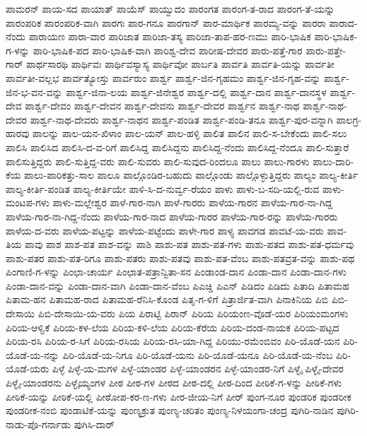 ಪಾಮರನ್
ಪಾಯ-ಸದ
ಪಾಯಾತ್
ಪಾಯೆಸ್
ಪಾಯ್ವುದಂ
ಪಾರಂಗತ
ಪಾರಂಗ-ತ-ರಾದ
ಪಾರಂಗ-ತೆ-ಯನ್ನು
ಪಾರಂಪರಿಕ
ಪಾರಂಪರಿಕ-ವಾಗಿ
ಪಾರಗಃ
ಪಾರ-ಗನೂ
ಪಾರಗಾನ್
ಪಾರ-ಮಾರ್ಥಿಕ
ಪಾರಮ್ಯ-ವನ್ನು
ಪಾರರಾ
ಪಾರಾದ-ನೆಂದು
ಪಾರಾಯಣ
ಪಾರಾ-ವಾರ
ಪಾರಿಜಾತ
ಪಾರಿಜಾ-ತಸ್ಯ
ಪಾರಿಜಾ-ತಾಪ-ಹರ-ಣಮು
ಪಾರಿ-ಭಾಷಿಕ
ಪಾರಿ-ಭಾಷಿಕ-ಗ-ಳನ್ನು
ಪಾರಿ-ಭಾಷಿಕ-ಪದ
ಪಾರಿ-ಭಾಷಿಕ-ವಾಗಿ
ಪಾರಿಶ್ವ-ದೇವ
ಪಾರೀಷ-ದೇವರ
ಪಾರು-ಪತ್ತೆ-ಗಾರ
ಪಾರು-ಪತ್ತೇ-ಗಾರ್
ಪಾರ್ಥಸಾರಥಿ
ಪಾರ್ಥಿವಃ
ಪಾರ್ಥಿವಸ್ಯಾಸ್ಯ
ಪಾರ್ಥಿವೋ
ಪಾರ್ಬತಿ
ಪಾರ್ವತಿ
ಪಾರ್ವತಿ-ಯನ್ನು
ಪಾರ್ವತೀ
ಪಾರ್ವತೀ-ವಲ್ಲಭ
ಪಾರ್ವತ್ಯೋಸ್ತು
ಪಾರ್ವರುಂ
ಪಾರ್ಶ್ವ
ಪಾರ್ಶ್ವ-ಜಿನ-ಗೃಹಮಂ
ಪಾರ್ಶ್ವ-ಜಿನ-ಗೃಹ-ವನ್ನು
ಪಾರ್ಶ್ವ-ಜಿನ-ಭ-ವನ-ವನ್ನು
ಪಾರ್ಶ್ವ-ಜಿನಾ-ಲಯ
ಪಾರ್ಶ್ವ-ಜಿನೇಶ್ವರ
ಪಾರ್ಶ್ವ-ದಲ್ಲಿ
ಪಾರ್ಶ್ವ-ದಾನ
ಪಾರ್ಶ್ವ-ದಾನಸ್ಥಳ
ಪಾರ್ಶ್ವ-ದೇವ
ಪಾರ್ಶ್ವ-ದೇವಂ
ಪಾರ್ಶ್ವ-ದೇವನ
ಪಾರ್ಶ್ವ-ದೇವನು
ಪಾರ್ಶ್ವ-ದೇವರ
ಪಾರ್ಶ್ವನ
ಪಾರ್ಶ್ವ-ನಾಥ
ಪಾರ್ಶ್ವ-ನಾಥ-ದೇವರ
ಪಾರ್ಶ್ವ-ನಾಥ-ದೇವರು
ಪಾರ್ಶ್ವ-ನಾಥನ
ಪಾರ್ಶ್ವ-ಪಂಡಿತ
ಪಾರ್ಶ್ವ-ಪಂಡಿ-ತನೂ
ಪಾರ್ಶ್ವ-ಪುರ-ವನ್ನಾಗಿ
ಪಾಲಗ್ರ-ಹಾರವು
ಪಾಲನ್ನು
ಪಾಲ-ಯನ-ಖಿಳಾಂ
ಪಾಲ-ಯನ್
ಪಾಲ-ಹಳ್ಳಿ
ಪಾಲಿತ
ಪಾಲಿನ
ಪಾಲಿ-ಸ-ಬೇಕೆಂದು
ಪಾಲಿ-ಸಲು
ಪಾಲಿಸಿ
ಪಾಲಿಸಿದ
ಪಾಲಿಸಿ-ದ-ವ-ರಿಗೆ
ಪಾಲಿಸಿದ್ದ
ಪಾಲಿಸಿದ್ದನು
ಪಾಲಿಸಿದ್ದ-ನೆಂದು
ಪಾಲಿಸಿದ್ದ-ನೆಂದೂ
ಪಾಲಿ-ಸುತ್ತಾರೆ
ಪಾಲಿಸುತ್ತಿದ್ದರು
ಪಾಲಿ-ಸುತ್ತಿದ್ದ-ವರು
ಪಾಲಿ-ಸುವರು
ಪಾಲಿ-ಸುವುದ-ರಿಂದಲೂ
ಪಾಲು
ಪಾಲು-ಗಾರಳು
ಪಾಲು-ದಾರಿ-ಕೆಯ
ಪಾಲು-ಪಾರಿಕತ್ತು-ಸಾಲ
ಪಾಲೂ
ಪಾಲ್ಗೊಂಡಿರ-ಬಹುದು
ಪಾಲ್ಗೊಂಡು
ಪಾಲ್ಗೊಳ್ಳುತ್ತಿದ್ದರು
ಪಾಲ್ಯಂ
ಪಾಲ್ಯ-ಕೀರ್ತಿ
ಪಾಲ್ಯ-ಕೀರ್ತಿ-ಪಂಡಿತ
ಪಾಲ್ಯ-ಕೀರ್ತಿಯೇ
ಪಾಳಿ-ಸಿ-ದ-ನುರ್ವ್ವ-ರೆಯಂ
ಪಾಳು
ಪಾಳು-ಬ-ಸದಿ-ಯಲ್ಲಿ-ರುವ
ಪಾಳು-ಮಂಟಪ-ಗಳು
ಪಾಳು-ಮಲ್ಲೇಶ್ವರ
ಪಾಳೆ-ಗಾರ-ನಾಗಿ
ಪಾಳೆ-ಗಾರರು
ಪಾಳೆಯ-ಗಾರನ
ಪಾಳೆಯ-ಗಾರ-ನಾ-ಗಿದ್ದ
ಪಾಳೆಯ-ಗಾರ-ನಾ-ಗಿದ್ದ-ನೆಂದು
ಪಾಳೆಯ-ಗಾರ-ನಾದ
ಪಾಳೆಯ-ಗಾರರ
ಪಾಳೆಯ-ಗಾರ-ರನ್ನು
ಪಾಳೆಯ-ಗಾರರು
ಪಾಳೆಯ-ದ-ವರು
ಪಾಳೆಯ-ಪಟ್ಟನ್ನು
ಪಾಳೆಯ-ಪಟ್ಟೆಂದು
ಪಾಳೇ-ಗಾರ
ಪಾಳ್ಯ
ಪಾವಗಡ
ಪಾವಟೆ-ಯ-ವರು
ಪಾವ-ತಿಯ
ಪಾವು
ಪಾಶ
ಪಾಶ-ಪತ
ಪಾಶ-ವನ್ನು
ಪಾಶಿ
ಪಾಶು-ಪತ
ಪಾಶು-ಪತ-ಗಳು
ಪಾಶು-ಪತದ
ಪಾಶು-ಪತ-ಧರ್ಮವು
ಪಾಶು-ಪತರ
ಪಾಶು-ಪತ-ರಿಗೂ
ಪಾಶು-ಪತರು
ಪಾಶು-ಪತವು
ಪಾಶು-ಪತ-ವೆಂಬ
ಪಾಶು-ಪತವ್ರತ-ವನ್ನು
ಪಾಶು-ಪಥ
ಪಿಂಗಾಣಿ-ಗ-ಳನ್ನು
ಪಿಂಛಾ-ಚಾರ್ಯ
ಪಿಂಛಾತ-ಪತ್ರಾನ್ವಿತಾ-ಸನ
ಪಿಂಡಾಂಡ-ದಾನ
ಪಿಂಡಾ-ದಾನ
ಪಿಂಡಾ-ದಾನ-ಗಳು
ಪಿಂಡಾ-ದಾನ-ವನ್ನು
ಪಿಂಡಾ-ದಾನ-ವಾಗಿ
ಪಿಂಡಾ-ದಾನ-ವೆಂಬ
ಪಿಎಚ್ಡಿ
ಪಿಎನ್
ಪಿಡಿದಂ
ಪಿಡಿದು
ಪಿತಾದಿ
ಪಿತಾಮಹ
ಪಿತಾಮ-ಹನ
ಪಿತಾಮಹ-ರಾದ
ಪಿತಾಮಹ-ರೆನಿಸಿ-ಕೊಂಡ
ಪಿತೃ-ಗ-ಳಿಗೆ
ಪಿತ್ರಾರ್ಜಿತ-ವಾಗಿ
ಪಿನಾಕಿನಿಯ
ಪಿಬಿ
ಪಿಬಿ-ದೇಸಾಯಿ
ಪಿಬಿ-ದೇಸಾಯಿ-ಯ-ವರು
ಪಿಯ
ಪಿರಾಟ್ಟಿ
ಪಿರಾನ್
ಪಿರಿಯ
ಪಿರಿಯಂಣ-ವೊಡೆ-ಯರ
ಪಿರಿಯಂಮಂಗಳು
ಪಿರಿಯ-ಆಳ್ವಿಕೆ
ಪಿರಿಯ-ಕಳ-ಲೆಯ
ಪಿರಿಯ-ಕಳಿ-ಲೆಯ
ಪಿರಿಯ-ಕೆರೆಯ
ಪಿರಿಯ-ದಂಡ-ನಾಯಕ
ಪಿರಿಯ-ಪಟ್ಟದ
ಪಿರಿಯ-ರಸಿ
ಪಿರಿಯ-ರ-ಸಿಗೆ
ಪಿರಿಯ-ರಸಿಯ
ಪಿರಿಯ-ರಸಿ-ಯಾ-ಗಿದ್ದ
ಪಿರಿಯು-ರಮೆಂಬಿವಂ
ಪಿರಿ-ಯೊಡೆ-ಯನ
ಪಿರಿ-ಯೊಡೆ-ಯ-ನನ್ನು
ಪಿರಿ-ಯೊಡೆ-ಯ-ನಿಗೂ
ಪಿರಿ-ಯೊಡೆ-ಯನು
ಪಿರಿ-ಯೊಡೆ-ಯನೂ
ಪಿರಿ-ಯೊಡೆ-ಯ-ನೆಂಬ
ಪಿರಿ-ಯೊಡೆ-ಯರು
ಪಿಳ್ಳೆ
ಪಿಳ್ಳೆ-ಯ-ಮಗಳ
ಪಿಳ್ಳೆ-ಯಾಂಡರ
ಪಿಳ್ಳೆ-ಯಾಂಡರನ
ಪಿಳ್ಳೆ-ಯಾಂಡರ-ನಿಗೆ
ಪಿಳ್ಳೈ
ಪಿಳ್ಳೈ-ದೇವರ
ಪಿಳ್ಳೈ-ಯಾಂಡರನು
ಪಿಳ್ಳೈಯ್ಯಂಗಳ
ಪೀಠ
ಪೀಠ-ಗಳ
ಪೀಠದ
ಪೀಠ-ದಲ್ಲಿ
ಪೀಠ-ದಿಂದ
ಪೀಠಿಕೆ-ಗ-ಳನ್ನು
ಪೀಠಿಕೆ-ಗಳು
ಪೀಠಿಕೆ-ಯನ್ನು
ಪೀಠಿಕೆ-ಯಲ್ಲಿ
ಪೀಠೋಪ-ಕರ-ಣ-ಗಳು
ಪೀರ-ಜೀಯ-ನಿಗೆ
ಪೀರ್
ಪುಂಗ-ನೂರ
ಪುಂಡರಿಕ
ಪುಂಡರೀಕ
ಪುಂಡರೀಕ-ನಂಬಿ
ಪುಂಡಾಟಿಕೆ-ಯನ್ನು
ಪುಂಣ್ಯಕ್ರುತ
ಪುಂಣ್ಯ-ಚರಿತಂ
ಪುಂಣ್ಯ-ನಿಳಯಂಗಾ-ಚಂದ್ರ
ಪುಗಿರಿ-ನಾಡಿನ
ಪುಗಿರಿ-ನಾಡು-ಪೊ-ಗರ್ನಾಡು
ಪುಗಿಸಿ-ದಾರ್
